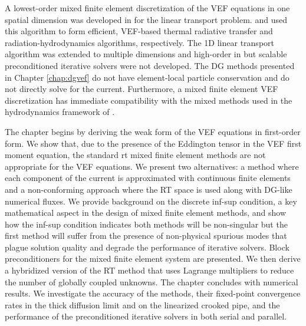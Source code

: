 \documentclass[../doc.tex]{subfiles}
\begin{document}
A lowest-order mixed finite element discretization of the VEF equations in one spatial dimension was developed in \cite{me} for the linear transport problem. \textcite{LOU2019258} and \textcite{LOU2021110393} used this algorithm to form efficient, VEF-based thermal radiative transfer and radiation-hydrodynamics algorithms, respectively. The 1D linear transport algorithm was extended to multiple dimensions and high-order in \cite{olivier_mandc} but scalable preconditioned iterative solvers were not developed. 
The DG methods presented in Chapter \ref{chap:dgvef} do not have element-local particle conservation and do not directly solve for the current. Furthermore, a mixed finite element VEF discretization has immediate compatibility with the mixed methods used in the hydrodynamics framework of \cite{blast}. 

The chapter begins by deriving the weak form of the VEF equations in first-order form. We show that, due to the presence of the Eddington tensor in the VEF first moment equation, the standard \gls{rt} mixed finite element methods are not appropriate for the VEF equations. We present two alternatives: a method where each component of the current is approximated with continuous finite elements and a non-conforming approach where the RT space is used along with DG-like numerical fluxes. 
We provide background on the discrete inf-sup condition, a key mathematical aspect in the design of mixed finite element methods, and show how the inf-sup condition indicates both methods will be non-singular but the first method will suffer from the presence of non-physical spurious modes that plague solution quality and degrade the performance of iterative solvers. 
Block preconditioners for the mixed finite element system are presented. 
We then derive a hybridized version of the RT method that uses Lagrange multipliers to reduce the number of globally coupled unknowns. 
The chapter concludes with numerical results. We investigate the accuracy of the methods, their fixed-point convergence rates in the thick diffusion limit and on the linearized crooked pipe, and the performance of the preconditioned iterative solvers in both serial and parallel. 
\end{document}
